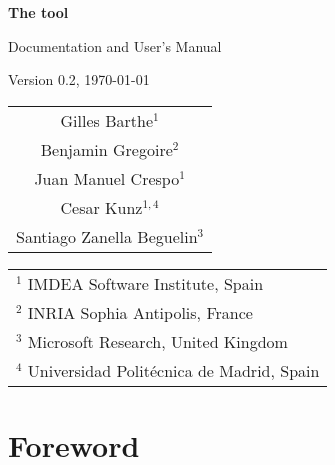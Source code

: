 \thispagestyle{empty}

\begin{center}


\vfill

{\fontsize{40}{80pt}\selectfont\bfseries\sffamily\sc The \EasyCrypt tool}

\vfill


\vfill

{\fontsize{20}{20pt}\selectfont\sffamily Documentation and User's Manual}

\vfill

\begin{LARGE}
  Version 0.2,  \today 
\end{LARGE}

\vfill

\begin{Large}
  \begin{tabular}{c}
  Gilles Barthe$^{1}$ \\
  Benjamin Gregoire$^{2}$  \\
  Juan Manuel Crespo$^{1}$ \\
  Cesar Kunz$^{1,4}$\\
  Santiago Zanella Beguelin$^{3}$
\end{tabular}
\end{Large}
\vfill

\begin{flushleft}

\begin{tabular}{l}
$^1$ IMDEA Software Institute, Spain \\
$^2$ INRIA Sophia Antipolis, France \\
$^3$ Microsoft Research, United Kingdom \\
$^4$ Universidad Polit\'ecnica de Madrid, Spain \\
\end{tabular}

\bigskip



\end{flushleft}
\end{center}

\chapter*{Foreword}

